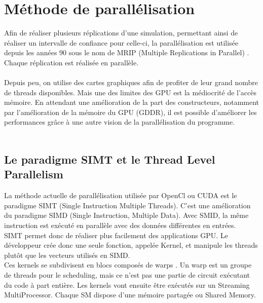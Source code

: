 \documentclass[a4paper,11pt]{report}
\begin{document}
\section{Méthode de parallélisation}
\vspace{6mm}
\normalsize{
Afin de réaliser plusieurs réplications d'une simulation, permettant ainsi de réaliser un intervalle de confiance pour celle-ci, la parallélisation est utilisée depuis les années 90 sous le nom de MRIP (Multiple Replications in Parallel) \cite{Pawlikowski.etal.1994}. Chaque réplication est réalisée en parallèle.\\ \\

Depuis peu, on utilise des cartes graphiques afin de profiter de leur grand nombre de threads disponibles. Mais une des limites des GPU est la médiocrité de l'accès mémoire. En attendant une amélioration de la part des constructeurs, notamment par l'amélioration de la mémoire du GPU (GDDR), il est possible d'améliorer les performances grâce à une autre vision de la parallélisation du programme.\\ \\

\subsection{Le paradigme SIMT et le Thread Level Parallelism}
\vspace{6mm}
La méthode actuelle de parallélisation utilisée par OpenCl ou CUDA est le paradigme SIMT (Single Instruction Multiple Threads). C'est une amélioration du paradigme SIMD (Single Instruction, Multiple Data). Avec SMID, la même instruction est exécuté en parallèle avec des données différentes en entrées. \\


SIMT permet donc de réaliser plus facilement des applications GPU. Le développeur crée donc une seule fonction, appelée Kernel, et manipule les threads plutôt que les vecteurs utilisés en SIMD. \\

Ces kernels se subdivisent en blocs composés de warps . Un warp est un groupe de threads pour le scheduling, mais ce n'est pas une partie de circuit exécutant du code à part entière. Les kernels vont ensuite être exécutés sur un Streaming MultiProcessor. Chaque SM dispose d’une mémoire partagée ou Shared Memory. 

}
\end{document}
